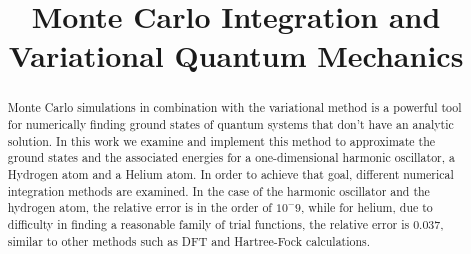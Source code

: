 \documentclass[conference]{IEEEtran}
\begin{document}
\title{Monte Carlo Integration and Variational Quantum Mechanics}


\author{
\and
{}
\and
{}
}


\maketitle


\begin{abstract}

Monte Carlo simulations in combination with the variational method is a powerful tool for numerically finding ground states of quantum systems that don't have an analytic solution. In this work we examine and implement this method to approximate the ground states and the associated energies for a one-dimensional harmonic oscillator, a Hydrogen atom and a Helium atom. In order to achieve that goal, different numerical integration methods are examined. In the case of the harmonic oscillator and the hydrogen atom, the relative error is in the order of $10^-9$, while for helium, due to difficulty in finding a reasonable family of trial functions, the relative error is 0.037, similar to other methods such as DFT and Hartree-Fock calculations. 


\end{abstract}

\IEEEpeerreviewmaketitle














\end{document}
